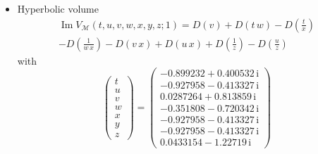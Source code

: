 \documentclass[12pt,reqno]{amsart}
\numberwithin{equation}{section}
\renewcommand{\Im}{\operatorname{Im}}
\newcommand{\I}{\mathrm{i}}
\begin{document}
\begin{itemize}
\item Hyperbolic volume
  \begin{multline*}
    \Im V_{\mathcal{M}}(t,u, v,w,x,y,z;1)
    =
    D\left(v   \right)
    + D \left(t \,  w\right) -
    D\left(\frac{t  }{x}\right) 
    \\
    -  D\left(\frac{1}{ w \, x}\right) 
    - D(v \, x)
    + D(u \, x) + D\left(\frac{1}{ z}\right)
    - D \left(\frac{u}{ z}\right)
  \end{multline*}
  with
  \begin{equation*}
    \begin{pmatrix}
      t \\ u \\ v \\ w\\ x\\ y\\ z
    \end{pmatrix}
    =
    \begin{pmatrix}
      -0.899232 + 0.400532 \, \I
      \\
      -0.927958 - 0.413327 \, \I
      \\
      0.0287264  + 0.813859  \, \I
      \\
      -0.351808 - 0.720342  \, \I
      \\
      -0.927958 - 0.413327 \, \I
      \\
       -0.927958 - 0.413327  \, \I
       \\
       0.0433154 - 1.22719 \, \I
    \end{pmatrix}
  \end{equation*}


\end{itemize}
\end{document}
